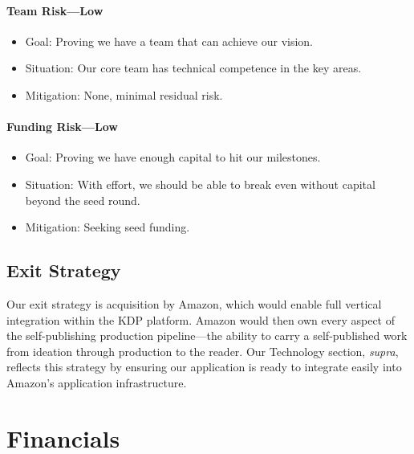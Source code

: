 \documentclass[10pt,openany]{book}
\providecommand{\tightlist}{%
  \setlength{\itemsep}{0pt}\setlength{\parskip}{0pt}}
\begin{document}
\newpage

\hypertarget{team-risklow}{%
\subsubsection{Team Risk---Low}\label{team-risklow}}

\begin{itemize}
\tightlist
\item
  Goal: Proving we have a team that can achieve our vision.
\item
  Situation: Our core team has technical competence in the key areas.
\item
  Mitigation: None, minimal residual risk.
\end{itemize}

\hypertarget{funding-risklow}{%
\subsubsection{Funding Risk---Low}\label{funding-risklow}}

\begin{itemize}
\tightlist
\item
  Goal: Proving we have enough capital to hit our milestones.
\item
  Situation: With effort, we should be able to break even without
  capital beyond the seed round.
\item
  Mitigation: Seeking seed funding.
\end{itemize}

\hypertarget{exit-strategy}{%
\section{Exit Strategy}\label{exit-strategy}}

Our exit strategy is acquisition by Amazon, which would enable full
vertical integration within the KDP platform. Amazon would then own
every aspect of the self-publishing production pipeline---the ability to
carry a self-published work from ideation through production to the
reader. Our Technology section, \emph{supra}, reflects this strategy by
ensuring our application is ready to integrate easily into Amazon's
application infrastructure.

\hypertarget{financials}{%
\chapter{Financials}\label{financials}}
\end{document}
